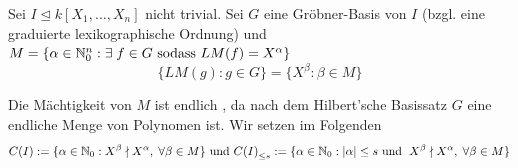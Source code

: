 \documentclass{article}
\newcommand*{\R}{k[X_{1},\ldots,X_{n}]}
\newcommand*{\indx}[2]{{#1}_{#2}}
\newcommand*{\potx}[2]{{#1}^{#2}}
\newcommand*{\N}{\mathbb{N}_0}
\begin{document}
Sei $I\unlhd \R$ nicht trivial. Sei $G$ eine Gröbner-Basis von $I$ (bzgl. eine graduierte lexikographische Ordnung) und $M=\{\alpha \in \N^n:\exists\;f\in G \textnormal{ sodass } LM(f)=\potx{X}{\alpha}\}$
\begin{displaymath}
\{LM(g):g\in G\}=\{\potx{X}{\beta}:\beta \in M \}
\end{displaymath}

Die Mächtigkeit von $M$ ist endlich , da nach dem Hilbert'sche Basissatz $G$ eine endliche Menge von Polynomen ist.
Wir setzen im Folgenden 
\begin{displaymath}
C(I):=\{\alpha \in \N: \potx{X}{\beta} \nmid \potx{X}{\alpha},\; \forall \beta \in M \}
\textnormal{ und } 
\indx{C(I)}{\leq s}:= \{\alpha \in \N:|\alpha|\leq s \textnormal{ und } \; \potx{X}{\beta} \nmid \potx{X}{\alpha},\; \forall \beta \in M \}
\end{displaymath}
\end{document}
